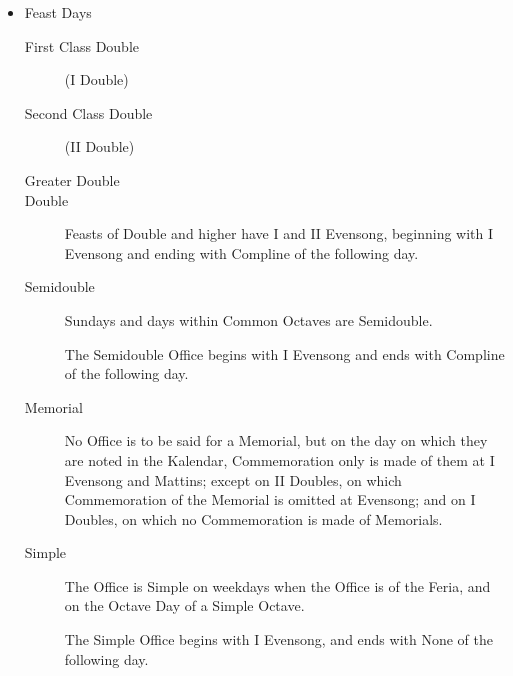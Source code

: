\begin{itemize}
    \item Feast Days
        \begin{description}
            \item[First Class Double] (I Double)
            \item[Second Class Double] (II Double)
            \item[Greater Double]
            \item[Double] Feasts of Double and higher have I and II Evensong, beginning with I Evensong and ending with Compline of the following day.
            \item[Semidouble] Sundays and days within Common Octaves are Semidouble.\par
            The Semidouble Office begins with I Evensong and ends with Compline of the following day.
            \item[Memorial] No Office is to be said for a Memorial, but on the day on which they are noted in the Kalendar, Commemoration only is made of them at I Evensong and Mattins; except on II Doubles, on which Commemoration of the Memorial is omitted at Evensong; and on I Doubles, on which no Commemoration is made of Memorials.
            \item[Simple] The Office is Simple on weekdays when the Office is of the Feria, and on the Octave Day of a Simple Octave.\par
                The Simple Office begins with I Evensong, and ends with None of the following day.
        \end{description}
        

\end{itemize}

